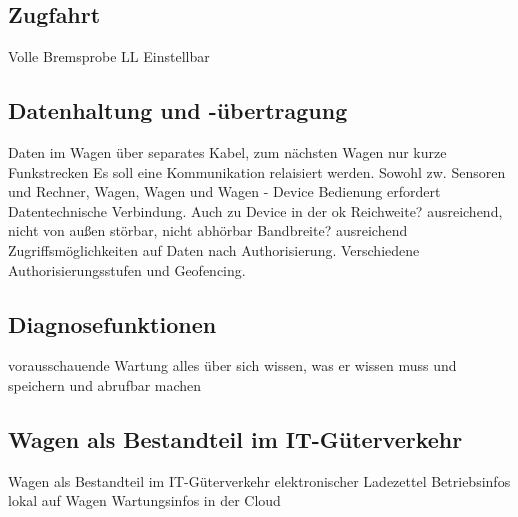 \subsection{Zugfahrt}
Volle Bremsprobe
LL Einstellbar

\subsection{Datenhaltung und -übertragung}
Daten im Wagen über separates Kabel, zum nächsten Wagen nur kurze Funkstrecken
Es soll eine Kommunikation relaisiert werden. Sowohl zw. Sensoren und Rechner, Wagen, Wagen und Wagen - Device
Bedienung erfordert Datentechnische Verbindung. Auch zu Device in der ok
Reichweite? ausreichend, nicht von außen störbar, nicht abhörbar
Bandbreite? ausreichend
Zugriffsmöglichkeiten auf Daten nach Authorisierung. Verschiedene Authorisierungsstufen und Geofencing.
\subsection{Diagnosefunktionen}
vorausschauende Wartung
alles über sich wissen, was er wissen muss und speichern und abrufbar machen

\subsection{Wagen als Bestandteil im IT-Güterverkehr}
Wagen als Bestandteil im IT-Güterverkehr
elektronischer Ladezettel
Betriebsinfos lokal auf Wagen
Wartungsinfos in der Cloud